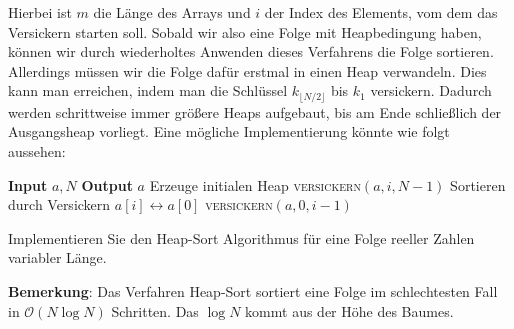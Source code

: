\documentclass[tikz,12pt]{article}
\begin{document}
Hierbei ist $m$ die Länge des Arrays und $i$ der Index des Elements, vom dem das Versickern starten soll.
Sobald wir also eine Folge mit Heapbedingung haben, können wir durch wiederholtes Anwenden dieses Verfahrens die Folge sortieren.
Allerdings müssen wir die Folge dafür erstmal in einen Heap verwandeln. 
Dies kann man erreichen, indem man die Schlüssel $k_{\lfloor N/2\rfloor}$ bis $k_1$ versickern. 
Dadurch werden schrittweise immer größere Heaps aufgebaut, bis am Ende schließlich der Ausgangsheap vorliegt. 
Eine mögliche Implementierung könnte wie folgt aussehen:
\begin{algorithmic}[1]
  \State \textbf{Input} $a,N$
  \State \textbf{Output} $a$
  \Comment Erzeuge initialen Heap
  \State \textsc{versickern}$(a, i, N-1)$
  \EndFor
  \Comment Sortieren durch Versickern
  \State $a[i]\leftrightarrow a[0]$
  \State \textsc{versickern}$(a, 0, i-1)$
  \EndFor
  \EndProcedure
\end{algorithmic}
Implementieren Sie den Heap-Sort Algorithmus für eine Folge reeller Zahlen variabler Länge.

\textbf{Bemerkung}: Das Verfahren Heap-Sort sortiert eine Folge im schlechtesten Fall in $\mathcal{O}(N\log N)$ Schritten.
Das $\log N$ kommt aus der Höhe des Baumes.
\end{document}
